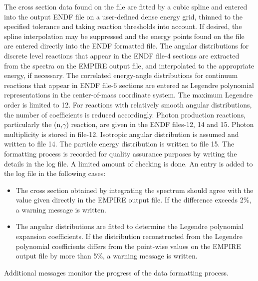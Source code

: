 \documentclass[twocolumn,amsmath,amssymb,10pt,groupedaddress,letter]{revtex4}
\begin{document}
The cross section data found on the file are fitted by a cubic spline
and entered into the output ENDF file  on a user-defined
dense energy grid, thinned to the specified tolerance and taking reaction
thresholds into account. If desired, the spline interpolation may
be suppressed and the energy points found on the file are entered
directly into the ENDF formatted file.
The angular distributions for discrete level reactions that appear
in the ENDF file-4 sections are extracted from the spectra on the
EMPIRE output file, and interpolated to the appropriate
energy, if necessary.
The correlated energy-angle distributions for continuum reactions
that appear in ENDF file-6 sections are entered as Legendre polynomial
representations in the center-of-mass coordinate system. The maximum
Legendre order is limited to 12. For reactions with relatively smooth
angular distributions, the number of coefficients is reduced accordingly.
Photon production reactions, particularly
the (n,$\gamma$) reaction, are given in the ENDF files-12, 14 and
15. Photon multiplicity is stored in file-12. Isotropic angular distribution
is assumed and written to file 14. The particle energy distribution
is written to file 15.
The formatting process is recorded for quality assurance purposes
by writing the details in the log file. A limited amount
of checking is done. An entry is added to the log file in the following
cases:
\begin{itemize}
\item The cross section obtained by integrating the spectrum should agree
with the value given directly in the EMPIRE output file.
If the difference exceeds 2\%, a warning message is written.
\item The angular distributions are fitted to determine the Legendre polynomial
expansion coefficients. If the distribution reconstructed from the
Legendre polynomial coefficients differs from the point-wise values
on the EMPIRE output file by more than 5\%, a warning message is written.
\end{itemize}
Additional messages monitor the progress of the data formatting process.
\end{document}

